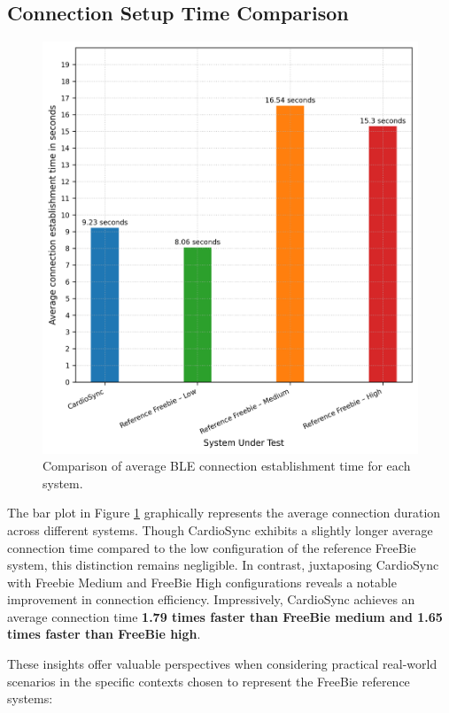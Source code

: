 \subsection{Connection Setup Time Comparison}
\begin{figure}[t]
    \centering
    \includegraphics[width=0.7\linewidth]{chapters/Results/Connection_time_comparison.png}
    \caption{Comparison of average BLE connection establishment time for each system.}
    \label{fig:conn_time_comp}
\end{figure}


The bar plot in Figure \ref{fig:conn_time_comp} graphically represents the average connection duration across different systems. Though CardioSync exhibits a slightly longer average connection time compared to the low configuration of the reference FreeBie system, this distinction remains negligible. In contrast, juxtaposing CardioSync with Freebie Medium and FreeBie High configurations reveals a notable improvement in connection efficiency. Impressively, CardioSync achieves an average connection time \textbf{1.79 times faster than FreeBie medium and 1.65 times faster than FreeBie high}.
\vspace{1\baselineskip}

\noindent These insights offer valuable perspectives when considering practical real-world scenarios in the specific contexts chosen to represent the FreeBie reference systems:


